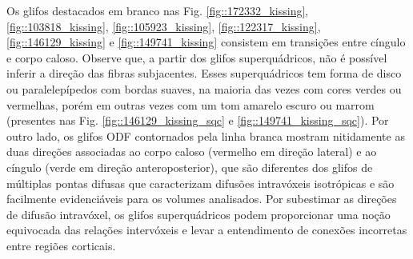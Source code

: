 
Os glifos destacados em branco nas Fig. \ref{fig::172332_kissing},
\ref{fig::103818_kissing},
\ref{fig::105923_kissing},
\ref{fig::122317_kissing},
\ref{fig::146129_kissing} e
\ref{fig::149741_kissing} consistem em transições entre cíngulo e corpo caloso. Observe que, a partir dos glifos superquádricos, não é possível inferir a direção das fibras subjacentes. Esses superquádricos tem forma de disco ou paralelepípedos com bordas suaves, na maioria das vezes com cores verdes ou vermelhas, porém em outras vezes com um tom amarelo escuro ou marrom (presentes nas Fig. \ref{fig::146129_kissing_sqc} e \ref{fig::149741_kissing_sqc}). Por outro lado, os glifos ODF contornados pela linha branca mostram nitidamente as duas direções associadas ao corpo caloso (vermelho em direção lateral) e ao cíngulo (verde em direção anteroposterior), que são diferentes dos glifos de múltiplas pontas difusas que caracterizam difusões intravóxeis isotrópicas e são facilmente evidenciáveis para os volumes analisados. Por subestimar as direções de difusão intravóxel, os glifos superquádricos podem proporcionar uma noção equivocada das relações intervóxeis e levar a entendimento de conexões incorretas entre regiões corticais. 



